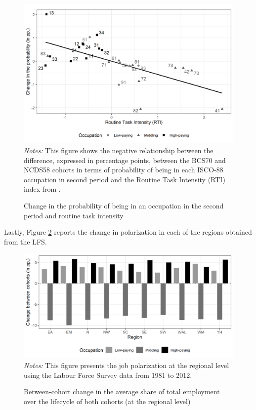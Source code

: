 \begin{figure}[!htb]
    \centering
    \caption{Change in the probability of being in an occupation in the second period and routine task intensity}
    \label{chap2-fig:polarize-rtiLIS-p3}
    \includegraphics[width=\linewidth]{chap2/graphic/polarize-rtiLIS-p3.png}
	\vspace{-3em}
	\justify\singlespacing\footnotesize{\textit{Notes:} This figure shows the negative relationship between the difference, expressed in percentage points, between the BCS70 and NCDS58 cohorts in terms of probability of being in each ISCO-88 occupation in second period and the Routine Task Intensity (RTI) index from \cite{Mahutga2018Job}.}
\end{figure}

Lastly, Figure \ref{chap2-fig:lfs-change} reports the change in polarization in each of the regions obtained from the LFS.  

\begin{figure}[!htb]
    \centering
    \caption{Between-cohort change in the average share of total employment over the lifecycle of both cohorts (at the regional level)}
    \label{chap2-fig:lfs-change}
    \includegraphics[width=\linewidth]{chap2/graphic/lfs-change.png}
	\vspace{-3em}
	\justify\singlespacing\footnotesize{\textit{Notes:} This figure presents the job polarization at the regional level using the Labour Force Survey data from 1981 to 2012.}
\end{figure}
